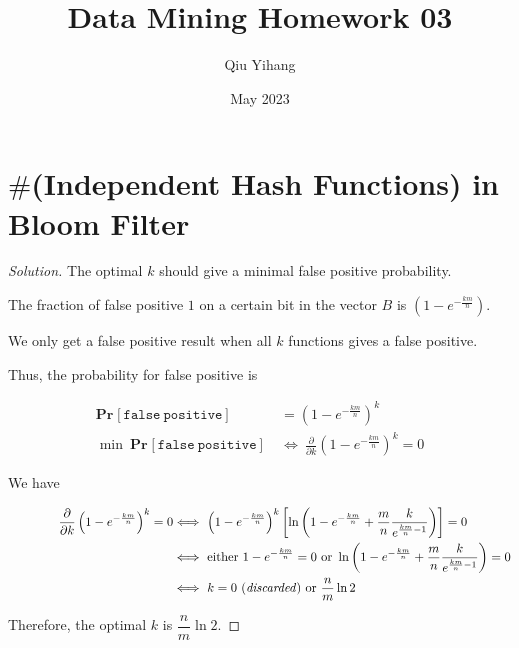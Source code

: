 \documentclass{article}
\title{\textbf{Data Mining Homework 03}}
\author{Qiu Yihang}
\date{May 2023}
\newenvironment{solution}{\begin{proof}[\noindent\it Solution]}{\end{proof}}
\renewcommand{\Pr}[2]{\mathbf{Pr}_{#1}\left[#2\right]}
\newcommand{\bd}[1]{\boldsymbol{#1}}
\begin{document}
\maketitle

\vspace{3em}
\section{$\bd{\#}$(Independent Hash Functions) in Bloom Filter}
\vspace{1em}
\begin{solution}
    The optimal $k$ should give a minimal false positive probability.

    \hspace{2.6em}
    The fraction of false positive $1$ on a certain bit in the vector $B$ is $\left(1-e^{-\frac{km}{n}}\right)$.

    \hspace{2.6em}
    We only get a false positive result when all $k$ functions gives a false positive. 
    
    \hspace{2.6em}
    Thus, the probability for false positive is 
    
    \vspace{-2em}
    \begin{align*}
        \Pr{}{\mathtt{false\ positive}} & = \left(1-e^{-\frac{km}{n}}\right)^k \\
        \min\ \Pr{}{\mathtt{false\ positive}}\  &\Longleftrightarrow\ \frac{\partial}{\partial k}\left(1-e^{-\frac{km}{n}}\right)^k=0
    \end{align*}

    \hspace{2.6em}
    We have

    \vspace{-2em}
    \begin{align*}
        \qquad\qquad\frac{\partial}{\partial k}\left(1-e^{-\frac{km}{n}}\right)^k=0 &\Longleftrightarrow\ \left(1-e^{-\frac{km}{n}}\right)^k\left[\ln\left(1-e^{-\frac{km}{n}}+\frac{m}{n}\frac{k}{e^{\frac{km}{n}-1}}\right)\right]=0 \\
        &\Longleftrightarrow\ \text{either } 1-e^{-\frac{km}{n}}=0\text{ or } \ln\left(1-e^{-\frac{km}{n}}+\frac{m}{n}\frac{k}{e^{\frac{km}{n}-1}}\right) = 0\\
        &\Longleftrightarrow\  k = 0\text{ (\textit{discarded}) or }\frac{n}{m}\ln 2 
    \end{align*}

    \hspace{2.6em}
    Therefore, the optimal $k$ is $\dfrac{n}{m}\ln 2$.
\end{solution}
\end{document}
